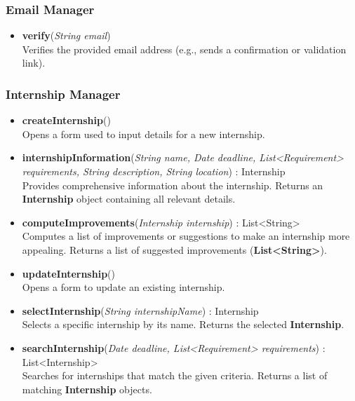 \subsubsection*{Email Manager}
\begin{itemize}

    \item \textbf{verify}(\textit{String email}) \\
    Verifies the provided email address (e.g., sends a confirmation or validation link).

\end{itemize}

\subsubsection*{Internship Manager}
\begin{itemize}

    \item \textbf{createInternship}() \\
    Opens a form used to input details for a new internship.

    \item \textbf{internshipInformation}(\textit{String name, Date deadline, List<Requirement> requirements, String description, String location}) : Internship \\
    Provides comprehensive information about the internship.  
    Returns an \textbf{Internship} object containing all relevant details.

    \item \textbf{computeImprovements}(\textit{Internship internship}) : List<String> \\
    Computes a list of improvements or suggestions to make an internship more appealing.  
    Returns a list of suggested improvements (\textbf{List<String>}).

    \item \textbf{updateInternship}() \\
    Opens a form to update an existing internship.

    \item \textbf{selectInternship}(\textit{String internshipName}) : Internship \\
    Selects a specific internship by its name.  
    Returns the selected \textbf{Internship}.

    \item \textbf{searchInternship}(\textit{Date deadline, List<Requirement> requirements}) : List<Internship> \\
    Searches for internships that match the given criteria.  
    Returns a list of matching \textbf{Internship} objects.


\end{itemize}
